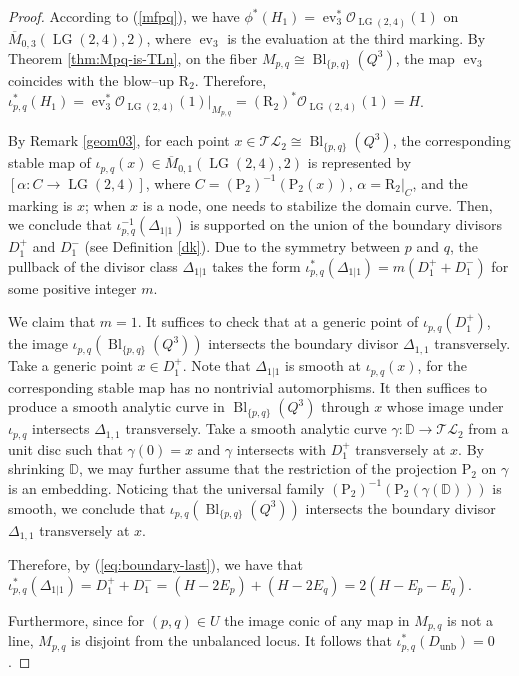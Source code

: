\documentclass[10pt]{amsart}
\theoremstyle{definition}
\newcommand{\LG}{\operatorname{LG}}
\newcommand{\Bl}{\operatorname{Bl}}
\newcommand{\ev}{\operatorname{ev}}
\newcommand{\TL}{\mathcal{TL}}
\DeclareMathOperator{\unb}{unb}
\newcommand{\RL}{\mathrm{R}}
\newcommand{\PL}{\mathrm{P}}
\theoremstyle{plain} %
\begin{document}
\begin{proof}
According to  (\ref{mfpq}), we have $\phi^*(H_1)=\ev_3^*\mathcal{O}_{\LG(2,4)}(1)$ on $\overline{M}_{0,3}(\LG(2,4),2)$, where $\ev_3$ is the evaluation at the third marking. By Theorem \ref{thm:Mpq-is-TLn}, on the fiber $M_{p,q}\cong \Bl_{\{p,q\}}(Q^3)$, the map $\ev_3$ coincides with the blow--up $\RL_2$. Therefore, $\iota_{p,q}^*(H_1)=\ev_3^*\mathcal{O}_{\LG(2,4)}(1)|_{M_{p,q}}=
(\RL_2)^* \mathcal{O}_{\LG(2,4)}(1)=H$. 

By Remark \ref{geom03}, for each point $x\in\TL_2\cong\Bl_{\{p,q\}}(Q^3)$, the
corresponding stable map of $\iota_{p,q}(x)\in\overline{M}_{0,1}(\LG(2,4),2)$ is represented by $[\alpha\colon C\rightarrow\LG(2,4)]$, where $C=(\PL_2)^{-1}(\PL_2(x))$, $\alpha=\RL_2|_C$, and the marking is $x$; when $x$ is a node, one needs to stabilize the domain curve. Then, we conclude that $\iota_{p,q}^{-1}(\Delta_{1|1})$ is supported on the union of the boundary divisors $D^+_1$ and $D^-_1$ (see Definition \ref{dk}). Due to the symmetry between $p$ and $q$, the pullback of the divisor class $\Delta_{1|1}$ takes the form $\iota_{p,q}^*(\Delta_{1|1}) = m(D^+_1 + D^-_1)$ for some positive integer $m$.

We claim that $m=1$. It suffices to check that at a generic point of $\iota_{p,q}(D^+_1)$, the image $ \iota_{p,q}( \operatorname{Bl}_{\{p,q\}}(Q^3))$ intersects the boundary divisor $\Delta_{1,1}$ transversely. Take a generic point $x\in D^+_1$. Note that $\Delta_{1|1}$ is smooth at $\iota_{p,q}(x)$, for the corresponding stable map has no nontrivial automorphisms. It then suffices to produce a smooth analytic curve in $\operatorname{Bl}_{\{p,q\}}(Q^3)$ through $x$ whose image under $\iota_{p,q}$ intersects $\Delta_{1,1}$ transversely. Take a smooth analytic curve $\gamma\colon\mathbb D\rightarrow\TL_2$ from a unit disc such that $\gamma(0)=x$ and $\gamma$ intersects with $D^+_1$ transversely at $x$. By shrinking $\mathbb D$, we may further assume that the restriction of the projection $\PL_2$ on $\gamma$ is an embedding. 
Noticing that the universal family $(\PL_2)^{-1}(\PL_2(\gamma(\mathbb D)))$ is smooth, we conclude that $ \iota_{p,q}( \operatorname{Bl}_{\{p,q\}}(Q^3))$ intersects the boundary divisor $\Delta_{1,1}$ transversely at $x$.


Therefore, by (\ref{eq:boundary-last}), we have that $\iota_{p,q}^*(\Delta_{1|1})=D^+_1 + D^-_1=(H-2E_p)+(H-2E_q)=2(H-E_p-E_q)$. 


Furthermore, since for $(p,q)\in U$ the image conic of any map in $M_{p,q}$ is not a line, $M_{p,q}$ is disjoint from the unbalanced locus. It follows that $\iota_{p,q}^*(D_{\unb})=0$.
\end{proof}
\end{document}
